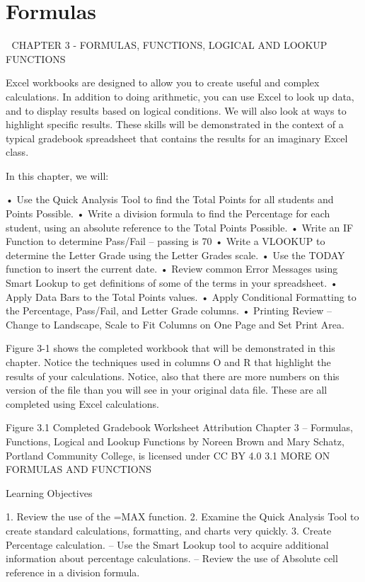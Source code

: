 \chapter{Formulas}\label{ch03:formulas}

                CHAPTER 3 - FORMULAS, FUNCTIONS, LOGICAL
AND LOOKUP FUNCTIONS



Excel workbooks are designed to allow you to create useful and complex calculations. In addition to
doing arithmetic, you can use Excel to look up data, and to display results based on logical conditions.
We will also look at ways to highlight specific results. These skills will be demonstrated in the context
of a typical gradebook spreadsheet that contains the results for an imaginary Excel class.

In this chapter, we will:

• Use the Quick Analysis Tool to find the Total Points for all students and Points Possible.
• Write a division formula to find the Percentage for each student, using an absolute reference to the
Total Points Possible.
• Write an IF Function to determine Pass/Fail – passing is 70%
• Write a VLOOKUP to determine the Letter Grade using the Letter Grades scale.
• Use the TODAY function to insert the current date.
• Review common Error Messages using Smart Lookup to get definitions of some of the terms in
your spreadsheet.
• Apply Data Bars to the Total Points values.
• Apply Conditional Formatting to the Percentage, Pass/Fail, and Letter Grade columns.
• Printing Review – Change to Landscape, Scale to Fit Columns on One Page and Set Print Area.

Figure 3-1 shows the completed workbook that will be demonstrated in this chapter. Notice the
techniques used in columns O and R that highlight the results of your calculations. Notice, also that
there are more numbers on this version of the file than you will see in your original data file. These
are all completed using Excel calculations.

Figure 3.1 Completed Gradebook Worksheet
Attribution
Chapter 3 – Formulas, Functions, Logical and Lookup Functions by Noreen Brown and Mary Schatz,
Portland Community College, is licensed under CC BY 4.0
3.1 MORE ON FORMULAS AND FUNCTIONS




Learning Objectives


1. Review the use of the =MAX function.
2. Examine the Quick Analysis Tool to create standard calculations, formatting, and charts very quickly.
3. Create Percentage calculation.
– Use the Smart Lookup tool to acquire additional information about percentage calculations.
– Review the use of Absolute cell reference in a division formula.



